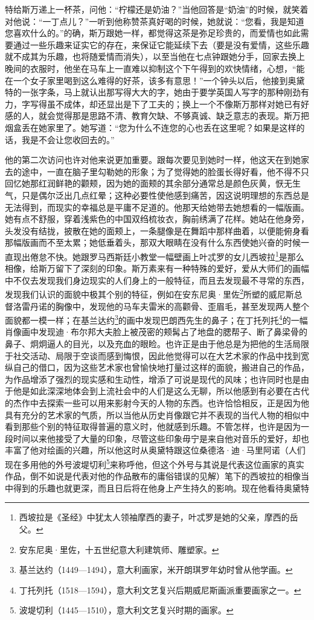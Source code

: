 特给斯万递上一杯茶，问他：“柠檬还是奶油？”当他回答是“奶油”的时候，就笑着对他说：“一丁点儿？”一听到他称赞茶真好喝的时候，她就说：“您看，我是知道您喜欢什么的。”的确，斯万跟她一样，都觉得这茶是弥足珍贵的，而爱情也如此需要通过一些乐趣来证实它的存在，来保证它能延续下去（要是没有爱情，这些乐趣就不成其为乐趣，也将随爱情而消失），以至当他在七点钟跟她分手，回家去换上晚间的衣服时，他坐在马车上一直难以抑制这个下午得到的欢快情绪，心想，“能在一个女子家里喝到这么难得的好茶，该多有意思！”一个钟头以后，他接到奥黛特的一张字条，马上就认出那写得大大的字，她由于要学英国人写字的那种刚劲有力，字写得虽不成体，却还显出是下了工夫的；换上一个不像斯万那样对她已有好感的人，就会觉得那是思路不清、教育欠缺、不够真诚、缺乏意志的表现。斯万把烟盒丢在她家里了。她写道：“您为什么不连您的心也丢在这里呢？如果是这样的话，我是不会让您收回去的。”
\par 他的第二次访问也许对他来说更加重要。跟每次要见到她时一样，他这天在到她家去的途中，一直在脑子里勾勒她的形象；为了觉得她的脸蛋长得好看，他不得不只回忆她那红润鲜艳的颧颊，因为她的面颊的其余部分通常总是颜色灰黄，恹无生气，只是偶尔泛出几点红晕；这种必要性使他感到痛苦，因这说明理想的东西总是无法得到，而现实的幸福总是平庸不足道的。他那天给她带去她想看的一幅版画。她有点不舒服，穿着浅紫色的中国双绉梳妆衣，胸前绣满了花样。她站在他身旁，头发没有结拢，披散在她的面颊上，一条腿像是在舞蹈中那样曲着，以便能俯身看那幅版画而不至太累；她低垂着头，那双大眼睛在没有什么东西使她兴奋的时候一直现出倦怠不快。她跟罗马西斯廷小教堂一幅壁画上叶忒罗的女儿西坡拉\footnote{西坡拉是《圣经》中犹太人领袖摩西的妻子，叶忒罗是她的父亲，摩西的岳父。}是那么相像，给斯万留下了深刻的印象。斯万素来有一种特殊的爱好，爱从大师们的画幅中不仅去发现我们身边现实的人们身上的一般特征，而且去发现最不寻常的东西，发现我们认识的面貌中极其个别的特征，例如在安东尼奥·里佐\footnote{安东尼奥·里佐，十五世纪意大利建筑师、雕塑家。}所塑的威尼斯总督洛雷丹诺的胸像中，发现他的马车夫雷米的高颧骨、歪眉毛，甚至发现两人整个面貌都一模一样；在基兰达约\footnote{基兰达约（1449—1494），意大利画家，米开朗琪罗年幼时曾从他学画。}的画中发现巴朗西先生的鼻子；在丁托列托\footnote{丁托列托（1518—1594），意大利文艺复兴后期威尼斯画派重要画家之一。}的一幅肖像画中发现迪·布尔邦大夫脸上被茂密的颊髯占了地盘的腮帮子、断了鼻梁骨的鼻子、炯炯逼人的目光，以及充血的眼睑。也许正是由于他总是为把他的生活局限于社交活动、局限于空谈而感到悔恨，因此他觉得可以在大艺术家的作品中找到宽纵自己的借口，因为这些艺术家也曾愉快地打量过这样的面貌，搬进自己的作品，为作品增添了强烈的现实感和生动性，增添了可说是现代的风味；也许同时也是由于他是如此深深地体会到上流社会中的人们是这么无聊，所以他感到有必要在古代的杰作中去探索一些可以用来影射今天的人物的东西。也许恰恰相反，正是因为他具有充分的艺术家的气质，所以当他从历史肖像跟它并不表现的当代人物的相似中看到那些个别的特征取得普遍的意义时，他就感到乐趣。不管怎样，也许是因为一段时间以来他接受了大量的印象，尽管这些印象毋宁是来自他对音乐的爱好，却也丰富了他对绘画的兴趣，所以他这时从奥黛特跟这位桑德洛·迪·马里阿诺（人们现在多用他的外号波堤切利\footnote{波堤切利（1445—1510），意大利文艺复兴时期的画家。}来称呼他，但这个外号与其说是代表这位画家的真实作品，倒不如说是代表对他的作品散布的庸俗错误的见解）笔下的西坡拉的相像当中得到的乐趣也就更深，而且日后将在他身上产生持久的影响。现在他看待奥黛特